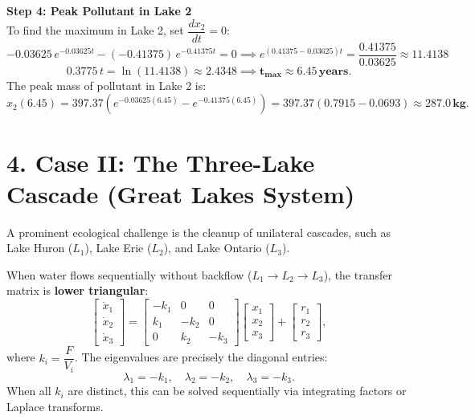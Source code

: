 \documentclass[12pt]{article}
\begin{document}
\begin{examplebox*}
\textbf{Step 4: Peak Pollutant in Lake 2}\\
To find the maximum in Lake 2, set $\dfrac{dx_2}{dt} = 0$:
\[
  -0.03625\,e^{-0.03625 t} - (-0.41375)\,e^{-0.41375 t} = 0 \implies e^{(0.41375 - 0.03625)t} = \frac{0.41375}{0.03625} \approx 11.4138
\]
\[
  0.3775\,t = \ln(11.4138) \approx 2.4348 \implies \mathbf{t_{\max} \approx 6.45\,\text{years}}.
\]
The peak mass of pollutant in Lake 2 is:
\[
  x_2(6.45) = 397.37 \left(e^{-0.03625(6.45)} - e^{-0.41375(6.45)}\right) = 397.37(0.7915 - 0.0693) \approx \mathbf{287.0\,\text{kg}}.
\]
\end{examplebox*}

\vspace{10pt}

\section{4. Case II: The Three-Lake Cascade (Great Lakes System)}

A prominent ecological challenge is the cleanup of unilateral cascades, such as Lake Huron ($L_1$), Lake Erie ($L_2$), and Lake Ontario ($L_3$).

\begin{derivbox}
When water flows sequentially without backflow ($L_1 \to L_2 \to L_3$), the transfer matrix is \textbf{lower triangular}:
\begin{equation}
  \begin{bmatrix}
    \dot{x}_1 \\ \dot{x}_2 \\ \dot{x}_3
  \end{bmatrix} =
  \begin{bmatrix}
    -k_1 & 0 & 0 \\
    k_1 & -k_2 & 0 \\
    0 & k_2 & -k_3
  \end{bmatrix}
  \begin{bmatrix}
    x_1 \\ x_2 \\ x_3
  \end{bmatrix} +
  \begin{bmatrix}
    r_1 \\ r_2 \\ r_3
  \end{bmatrix},
\end{equation}
where $k_i = \dfrac{F}{V_i}$. The eigenvalues are precisely the diagonal entries:
\begin{equation}
  \lambda_1 = -k_1, \quad \lambda_2 = -k_2, \quad \lambda_3 = -k_3.
\end{equation}
When all $k_i$ are distinct, this can be solved sequentially via integrating factors or Laplace transforms.
\end{derivbox}
\end{document}
